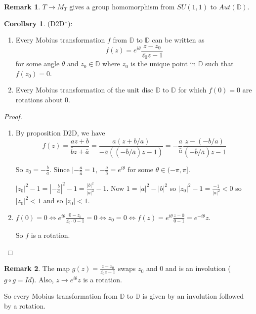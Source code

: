\documentclass[12pt,a4paper]{article}
\theoremstyle{definition}
\newtheorem{corollary}[definition]{Corollary}
\newtheorem*{remark}{Remark}
\begin{document}
\begin{remark}
	$T \rightarrow M_T$ gives a group homomorphism from $SU(1, 1)$ to $Aut(\mathbb{D})$.
\end{remark}

\begin{corollary}
	(D2D*):
	\begin{enumerate}
		\item Every Mobius transformation $f$ from $\mathbb{D}$ to $\mathbb{D}$ can be written as
		\[f(z) = e^{i\theta} \frac{z - z_0}{\bar{z_0}z - 1}\]
		for some angle $\theta$ and $z_0 \in \mathbb{D}$ where $z_0$ is the unique point in $\mathbb{D}$ such that $f(z_0) = 0$.
		\item Every Mobius transformation of the unit disc $\mathbb{D}$ to $\mathbb{D}$ for which $f(0) = 0$ are rotations about $0$.
	\end{enumerate}
\end{corollary}

\begin{proof}
	\begin{enumerate}
		\item By proposition D2D, we have
		\[f(z) = \frac{az + b}{\bar{b}z + \bar{a}} = \frac{a(z + b / a)}{-\bar{a}((-\bar{b} / \bar{a}) z - 1)} = -\frac{a}{\bar{a}} \frac{z - (-b / a)}{(-\bar{b} / \bar{a}) z - 1}\]

		So $z_0 = -\frac{b}{a}$. Since $|-\frac{a}{\hat{a}} = 1$, $-\frac{a}{\hat{a}} = e^{i\theta}$ for some $\theta \in (-\pi, \pi]$.

		$|z_0|^2 - 1 = |-\frac{b}{a}|^2 - 1 = \frac{|b|^2}{|a|^2} - 1$. Now $1 = |a|^2 - |b|^2$ so $|z_0|^2 - 1 = \frac{-1}{|a|^2} < 0$ so $|z_0|^2 < 1$ and so $|z_0| < 1$.
		\item $f(0) = 0 \Leftrightarrow e^{i\theta} \frac{0 - z_0}{\bar{z_0}\cdot 0 - 1} = 0 \Leftrightarrow z_0 = 0 \Leftrightarrow f(z) = e^{i\theta}\frac{z - 0}{0 - 1} = e^{-i\theta}z$.
		
		So $f$ is a rotation.
	\end{enumerate}
\end{proof}

\begin{remark}
	The map $g(z) = \frac{z - z_0}{\bar{z_0}z - 1}$ swaps $z_0$ and $0$ and is an involution ($g \circ g = Id$). Also, $z \rightarrow e^{i\theta}z$ is a rotation.

	So every Mobius transformation from $\mathbb{D}$ to $\mathbb{D}$ is given by an involution followed by a rotation.
\end{remark}
\end{document}
